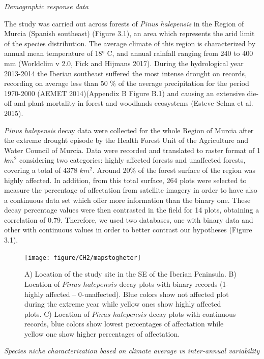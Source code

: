\documentclass[11pt,twoside]{reedthesis}
\begin{document}
\setlength{\parindent}{0pt} \emph{Demographic response data}\par

The study was carried out across forests of \emph{Pinus halepensis} in
the Region of Murcia (Spanish southeast) (Figure 3.1), an area which
represents the arid limit of the species distribution. The average
climate of this region is characterized by annual mean temperature of
18° C, and annual rainfall ranging from 240 to 400 mm (Worldclim v 2.0,
Fick and Hijmans 2017). During the hydrological year 2013-2014 the
Iberian southeast suffered the most intense drought on records,
recording on average less than 50 \% of the average precipitation for
the period 1970-2000 (AEMET 2014)(Appendix B Figure B.1) and causing an
extensive die-off and plant mortality in forest and woodlands ecosystems
(Esteve-Selma et al. 2015).\par
\setlength{\parindent}{30pt}

\emph{Pinus halepensis} decay data were collected for the whole Region
of Murcia after the extreme drought episode by the Health Forest Unit of
the Agriculture and Water Council of Murcia. Data were recorded and
translated to raster format of 1 \(km^2\) considering two categories:
highly affected forests and unaffected forests, covering a total of 4378
\(km^2\). Around 20\% of the forest surface of the region was highly
affected. In addition, from this total surface, 264 plots were selected
to measure the percentage of affectation from satellite imagery in order
to have also a continuous data set which offer more information than the
binary one. These decay percentage values were then contrasted in the
field for 14 plots, obtaining a correlation of 0.79. Therefore, we used
two databases, one with binary data and other with continuous values in
order to better contrast our hypotheses (Figure 3.1).\par

\setlength{\abovecaptionskip}{0pt}
\begin{figure}[hbt!]

{\centering \texttt{[image: figure/CH2/mapstogheter]} 

}

\caption[Location map of $Pinus$ $halepensis$ studied forests]{ A) Location of the study site in the SE of the Iberian Peninsula. B) Location of $Pinus$ $halepensis$ decay plots with binary records (1-highly affected – 0-unaffected). Blue colors show not affected plot during the extreme year while yellow ones show highly affected plots. C) Location of $Pinus$ $halepensis$ decay plots with continuous records, blue colors show lowest percentages of affectation while yellow one show higher percentages of affectation.}\label{fig:Ch2plot1}
\end{figure}
\setlength{\parindent}{0pt} \emph{Species niche characterization based
on climate average vs inter-annual variability}\par
\end{document}
